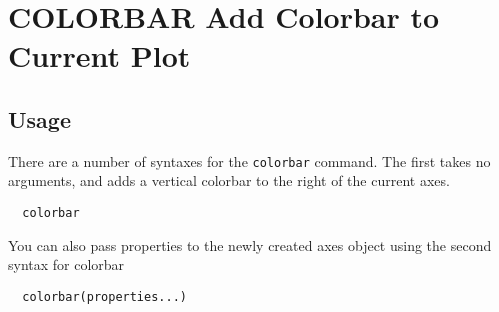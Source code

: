 \section{COLORBAR Add Colorbar to Current Plot}

\subsection{Usage}

There are a number of syntaxes for the \verb|colorbar| command.  The first
takes no arguments, and adds a vertical colorbar to the right of the current
axes.
\begin{verbatim}
  colorbar
\end{verbatim}
You can also pass properties to the newly created axes object using
the second syntax for colorbar
\begin{verbatim}
  colorbar(properties...)
\end{verbatim}
